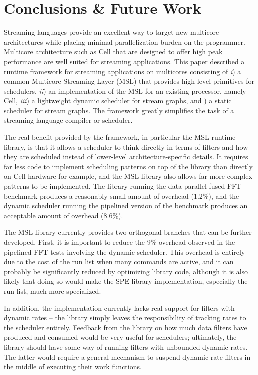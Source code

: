 \section{Conclusions \& Future Work}\label{ch:conc}

Streaming languages provide an excellent way to
target new multicore architectures while placing minimal
parallelization burden on the programmer. Multicore architecture such
as Cell that are designed to offer high peak performance are well
suited for streaming applications. This paper described a runtime
framework for streaming applications on multicores consisting of
\emph{i}) a common Multicore Streaming Layer (MSL) that provides
high-level primitives for schedulers, \emph{ii}) an implementation
of the MSL for an existing processor, namely Cell, \emph{iii}) a
lightweight dynamic scheduler for stream graphs, and ) a
static scheduler for stream graphs. The framework greatly
simplifies the task of a streaming language compiler or scheduler.

The real benefit provided by the framework, in particular the MSL
runtime library, is that it allows a scheduler to think directly in
terms of filters and how they are scheduled instead of lower-level
architecture-specific details. It requires far less code to implement
scheduling patterns on top of the library than directly on Cell
hardware for example, and the MSL library also allows far more complex
patterns to be implemented. The library running the data-parallel
fused FFT benchmark produces a reasonably small amount of overhead
(1.2\%), and the dynamic scheduler running the pipelined version of
the benchmark produces an acceptable amount of overhead (8.6\%).

The MSL library currently provides two orthogonal branches that can be
further developed. First, it is important to reduce the 9\% overhead
observed in the pipelined FFT tests involving the dynamic
scheduler. This overhead is entirely due to the cost of the run list
when many commands are active, and it can probably be significantly
reduced by optimizing library code, although it is also likely that
doing so would make the SPE library implementation, especially the run
list, much more specialized.

In addition, the implementation currently lacks real support for
filters with dynamic rates -- the library simply leaves the
responsibility of tracking rates to the scheduler entirely. Feedback
from the library on how much data filters have produced and consumed
would be very useful for schedulers; ultimately, the library should
have some way of running filters with unbounded dynamic rates. The
latter would require a general mechanism to suspend dynamic rate
filters in the middle of executing their work functions.


